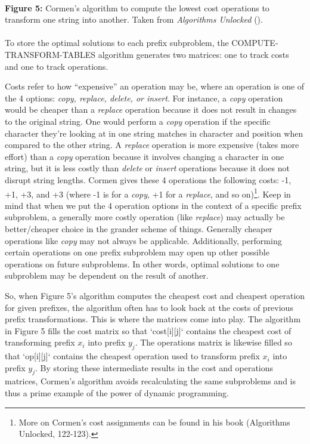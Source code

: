 \documentclass[12pt,letterpaper]{article}
\begin{document}
\paragraph{}
\begin{footnotesize}
    \noindent\textbf{Figure 5:} Cormen's algorithm to compute the lowest cost operations to transform one string into another. Taken from \textit{Algorithms Unlocked} (\cite{cormen}).
\end{footnotesize}
\paragraph{}

To store the optimal solutions to each prefix subproblem, the COMPUTE-TRANSFORM-TABLES algorithm generates two matrices: one to track costs and one to track operations. 

Costs refer to how “expensive” an operation may be, where an operation is one of the 4 options: \textit{copy, replace, delete, or insert}. For instance, a \textit{copy} operation would be cheaper than a \textit{replace} operation because it does not result in changes to the original string. One would perform a \textit{copy} operation if the specific character they’re looking at in one string matches in character and position when compared to the other string. A \textit{replace} operation is more expensive (takes more effort) than a \textit{copy} operation because it involves changing a character in one string, but it is less costly than \textit{delete} or \textit{insert} operations because it does not disrupt string lengths. Cormen gives these 4 operations the following costs: -1, +1, +3, and +3 (where -1 is for a \textit{copy}, +1 for a \textit{replace}, and so on)\footnote[1]{More on Cormen’s cost assignments can be found in his book (Algorithms Unlocked, 122-123).}. Keep in mind that when we put the 4 operation options in the context of a specific prefix subproblem, a generally more costly operation (like \textit{replace}) may actually be better/cheaper choice in the grander scheme of things. Generally cheaper operations like \textit{copy} may not always be applicable. Additionally, performing certain operations on one prefix subproblem may open up other possible operations on future subproblems. In other words, optimal solutions to one subproblem may be dependent on the result of another.

So, when Figure 5’s algorithm computes the cheapest cost and cheapest operation for given prefixes, the algorithm often has to look back at the costs of previous prefix transformations. This is where the matrices come into play. The algorithm in Figure 5 fills the cost matrix so that `cost[i][j]` contains the cheapest cost of transforming prefix $x_i$ into prefix $y_j$. The operations matrix is likewise filled so that `op[i][j]` contains the cheapest operation used to transform prefix $x_i$ into prefix $y_j$. By storing these intermediate results in the cost and operations matrices, Cormen’s algorithm avoids recalculating the same subproblems and is thus a prime example of the power of dynamic programming.
\end{document}
